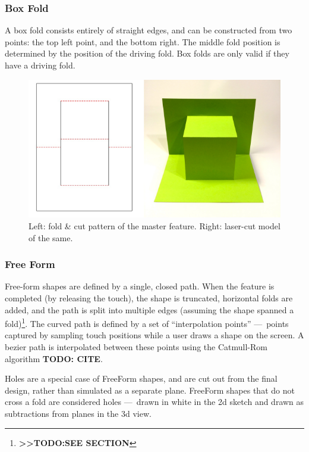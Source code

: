 \subsubsection{Box Fold}\label{box-fold}

A box fold consists entirely of straight edges, and can be constructed
from two points: the top left point, and the bottom right. The middle
fold position is determined by the position of the driving fold. Box
folds are only valid if they have a driving fold.

\begin{figure}[htbp]
\centering
\includegraphics{figures/33_UI_Interface_Data_Structures/box.pdf}
\caption{Left: fold \& cut pattern of the master feature. Right:
laser-cut model of the same.}
\end{figure}

\subsubsection{Free Form}\label{free-form}

Free-form shapes are defined by a single, closed path. When the feature
is completed (by releasing the touch), the shape is truncated,
horizontal folds are added, and the path is split into multiple edges
(assuming the shape spanned a fold)\footnote{\textbf{\textgreater{}\textgreater{}TODO:SEE
  SECTION}}. The curved path is defined by a set of ``interpolation
points'' ---~points captured by sampling touch positions while a user
draws a shape on the screen. A bezier path is interpolated between these
points using the Catmull-Rom algorithm \textbf{TODO: CITE}.

Holes are a special case of FreeForm shapes, and are cut out from the
final design, rather than simulated as a separate plane. FreeForm shapes
that do not cross a fold are considered holes ---~drawn in white in the
2d sketch and drawn as subtractions from planes in the 3d view.

